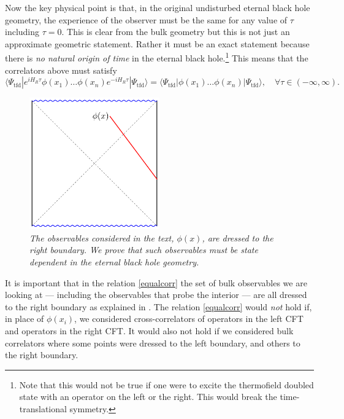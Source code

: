\documentclass[12pt]{article}
\newcommand{\tfd}{\Psi_{\text{tfd}}} %
\newcommand{\be}{\begin{equation}}
\newcommand{\ee}{\end{equation}}
\begin{document}
Now the key physical point is that,  in the original undisturbed eternal black hole geometry, the experience of the observer must be the same for any value of $\tau$ including $\tau = 0$. This is clear from the bulk geometry but this is not just an approximate geometric statement. Rather it must be an exact statement because there is {\em no natural origin of time} in the eternal black hole.\footnote{Note that this would not be true if one were to excite the thermofield doubled state with an operator on the left or the right. This would break the time-translational symmetry.} This means that the correlators above must satisfy
\be
\label{equalcorr}
\langle \tfd | e^{i H_R \tau} \phi(x_1) \ldots \phi(x_n) e^{-i H_R \tau} |\tfd \rangle =\langle \tfd | \phi(x_1) \ldots \phi(x_n) |\tfd \rangle, \quad \forall \tau \in (-\infty, \infty).
\ee

\begin{figure}[!ht]
\begin{center}
\includegraphics[width=0.5\textwidth]{dressedobservable.pdf}
\caption{\em The observables considered in the text, $\phi(x)$, are dressed to the right boundary. We prove that such observables must be state dependent in the eternal black hole geometry. \label{dressedobservable}}
\end{center}
\end{figure}
It is important that in the relation \eqref{equalcorr} the set of bulk observables we are looking at  --- including the observables that probe the interior --- are all dressed to the right boundary as explained in \cite{Papadodimas:2015xma,Papadodimas:2015jra}.    The relation \eqref{equalcorr} would {\em not} hold if, in place of $\phi(x_i)$, we considered cross-correlators of operators in the left CFT and operators in the right CFT. It would also not hold if we considered bulk correlators where some points were dressed to the left boundary, and others to the right boundary.
\end{document}
